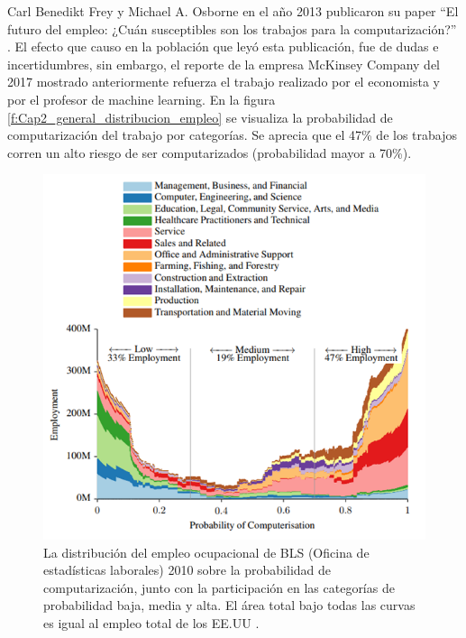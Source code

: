       \newpage
  
    Carl Benedikt Frey y Michael A. Osborne en el año 2013 publicaron su paper ``El futuro del empleo: ¿Cuán susceptibles son los trabajos para la computarización?” \cite{FREY2017254}. El efecto que causo en la población que leyó esta publicación, fue de dudas e incertidumbres, sin embargo, el reporte de la empresa McKinsey Company del 2017 mostrado anteriormente refuerza el trabajo realizado por el economista y por el profesor de machine learning. En la figura \eqref{f:Cap2_general_distribucion_empleo} se visualiza la probabilidad de computarización del trabajo por categorías. Se aprecia que el 47\% de los trabajos corren un alto riesgo de ser computarizados (probabilidad mayor a 70\%).
    
    \begin{figure}[htb]
        \centering
        \includegraphics[width=1\linewidth]{Main/Chapter2/Images2/distribucion-del-empleo.png}
        \caption{La distribución del empleo ocupacional de BLS (Oficina de estadísticas laborales) 2010 sobre la probabilidad de computarización, junto con la participación en las categorías de probabilidad baja, media y alta. El área total bajo todas las curvas es igual al empleo total de los EE.UU \cite{FREY2017254}.}
        \label{f:Cap2_general_distribucion_empleo}
    \end{figure}
    
